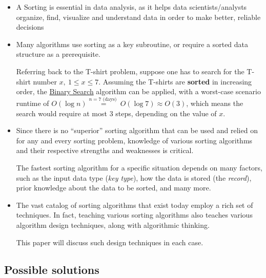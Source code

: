 \documentclass[a4paper]{article}
\renewcommand*{\textnormal}[1]{\text{ #1 }}
\begin{document}
            \begin{itemize}
                \item A
                    Sorting is essential in data analysis, as it helps data scientists/analysts organize, find, visualize and understand data in order to make better, reliable decisions
                \item 
                    Many algorithms use sorting as a key          subroutine, or require a sorted data structure as a prerequisite\supercite{clrs_algorithms}.

                    Referring back to the T-shirt problem, suppose one has to search for the T-shirt number \(x, \ 1 \leq x \leq 7\). Assuming the T-shirts are \textbf{sorted} in increasing order, the \href{https://en.wikipedia.org/wiki/Binary_search_algorithm}{Binary Search} algorithm can be applied, with a worst-case scenario runtime of \(O(\log n) \overset{n = 7 \textnormal{(days)}}{=} O(\log 7) \approx O(3)\), which means the search would require at most 3 steps, depending on the value of \(x\).

                    
                \item Since there is no ``superior'' sorting algorithm that can be used and relied on for any and every sorting problem, knowledge of various sorting algorithms and their respective strengths and weaknesses is critical. 
                
                The fastest sorting algorithm for a specific situation depends on many factors, such as the input data type (\emph{key type}), how the data is stored (the \emph{record}), prior knowledge about the data to be sorted\supercite{clrs_algorithms}, and many more.

                \item The vast catalog of sorting algorithms that exist 
                    today employ a rich set of techniques. 
                    In fact, teaching various sorting algorithms also teaches various algorithm design techniques, along with algorithmic thinking.
                    
                    This paper will discuss such design techniques in each case.
            \end{itemize}

        \subsection{Possible solutions}
\end{document}
